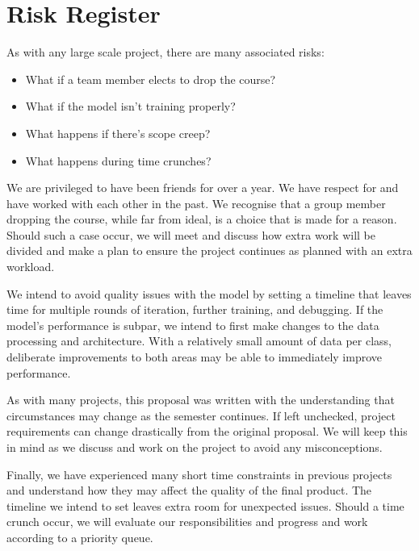 \documentclass{article} %
\begin{document}
\section{Risk Register}
As with any large scale project, there are many associated risks:

\begin{itemize}
  \item What if a team member elects to drop the course?
  \item What if the model isn't training properly?
  \item What happens if there's scope creep?
  \item What happens during time crunches?
\end{itemize}

We are privileged to have been friends for over a year. We have respect for and have worked with each other in the past. We recognise that a group member dropping the course, while far from ideal, is a choice that is made for a reason. Should such a case occur, we will meet and discuss how extra work will be divided and make a plan to ensure the project continues as planned with an extra workload.

We intend to avoid quality issues with the model by setting a timeline that leaves time for multiple rounds of iteration, further training, and debugging. If the model's performance is subpar, we intend to first make changes to the data processing and architecture. With a relatively small amount of data per class, deliberate improvements to both areas may be able to immediately improve performance.

As with many projects, this proposal was written with the understanding that circumstances may change as the semester continues. If left unchecked, project requirements can change drastically from the original proposal. We will keep this in mind as we discuss and work on the project to avoid any misconceptions.

Finally, we have experienced many short time constraints in previous projects and understand how they may affect the quality of the final product. The timeline we intend to set leaves extra room for unexpected issues. Should a time crunch occur, we will evaluate our responsibilities and progress and work according to a priority queue.

\label{last_page}



\end{document}
